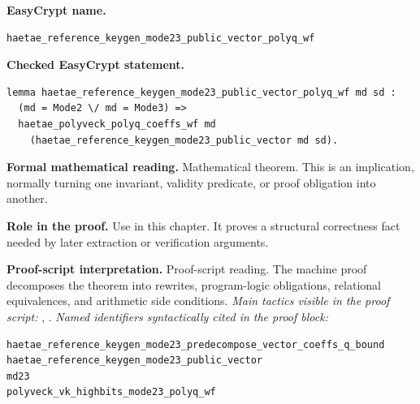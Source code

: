 \begin{formaltheorem}
\noindent\textbf{EasyCrypt name.}
\begin{lstlisting}[language=EasyCrypt,basicstyle=\ttfamily\scriptsize]
haetae_reference_keygen_mode23_public_vector_polyq_wf
\end{lstlisting}
\noindent\textbf{Checked EasyCrypt statement.}
\begin{lstlisting}[language=EasyCrypt,basicstyle=\ttfamily\scriptsize]
lemma haetae_reference_keygen_mode23_public_vector_polyq_wf md sd :
  (md = Mode2 \/ md = Mode3) =>
  haetae_polyveck_polyq_coeffs_wf md
    (haetae_reference_keygen_mode23_public_vector md sd).
\end{lstlisting}
\noindent\textbf{Formal mathematical reading.}
Mathematical theorem. This is an implication, normally turning one invariant, validity predicate, or proof obligation into another.

\noindent\textbf{Role in the proof.}
Use in this chapter. It proves a structural correctness fact needed by later extraction or verification arguments.

\noindent\textbf{Proof-script interpretation.}
Proof-script reading. The machine proof decomposes the theorem into rewrites, program-logic obligations, relational equivalences, and arithmetic side conditions.
\emph{Main tactics visible in the proof script:} , .
\emph{Named identifiers syntactically cited in the proof block:}
\begin{lstlisting}[language=EasyCrypt,basicstyle=\ttfamily\scriptsize]
haetae_reference_keygen_mode23_predecompose_vector_coeffs_q_bound
haetae_reference_keygen_mode23_public_vector
md23
polyveck_vk_highbits_mode23_polyq_wf
\end{lstlisting}

\end{formaltheorem}

